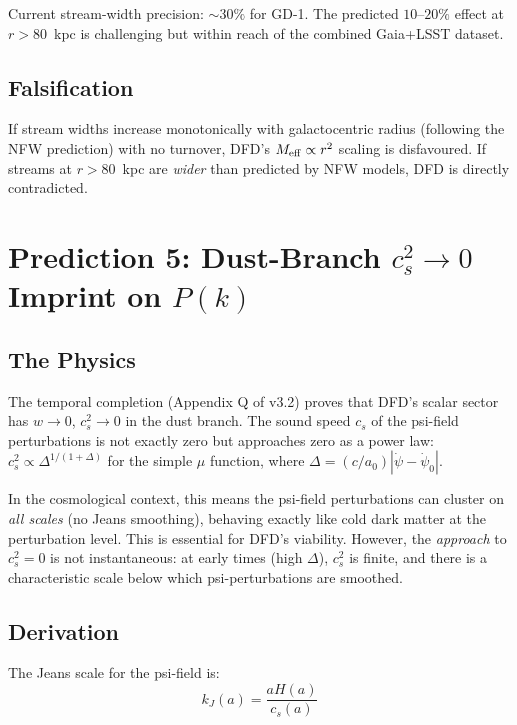 \documentclass[11pt]{article}
\begin{document}
Current stream-width precision: $\sim 30\%$ for GD-1.  The predicted
$10$--$20\%$ effect at $r > 80$~kpc is challenging but within reach
of the combined Gaia+LSST dataset.

\subsection{Falsification}

If stream widths increase monotonically with galactocentric radius
(following the NFW prediction) with no turnover, DFD's $M_{\rm eff}
\propto r^2$ scaling is disfavoured.  If streams at $r > 80$~kpc are
\emph{wider} than predicted by NFW models, DFD is directly contradicted.

\section{Prediction 5: Dust-Branch $c_s^2 \to 0$ Imprint on $P(k)$}
\label{sec:dust-branch}

\subsection{The Physics}

The temporal completion (Appendix Q of v3.2) proves that DFD's scalar
sector has $w \to 0$, $c_s^2 \to 0$ in the dust branch.  The sound speed
$c_s$ of the psi-field perturbations is not exactly zero but approaches
zero as a power law: $c_s^2 \propto \Delta^{1/(1+\Delta)}$ for the simple
$\mu$ function, where $\Delta = (c/a_0)|\dot\psi - \dot\psi_0|$.

In the cosmological context, this means the psi-field perturbations can
cluster on \emph{all scales} (no Jeans smoothing), behaving exactly like
cold dark matter at the perturbation level.  This is essential for DFD's
viability.  However, the \emph{approach} to $c_s^2 = 0$ is not
instantaneous: at early times (high $\Delta$), $c_s^2$ is finite, and
there is a characteristic scale below which psi-perturbations are smoothed.

\subsection{Derivation}

The Jeans scale for the psi-field is:
\begin{equation}
k_J(a) = \frac{a H(a)}{c_s(a)}
\end{equation}
\end{document}
